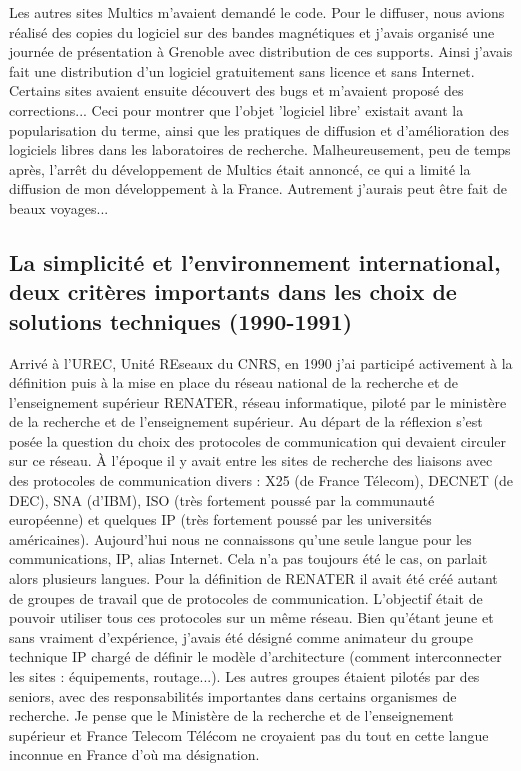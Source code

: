 \documentclass{FramateX}
\begin{document}
\begin{refsection}
Les autres sites Multics m'avaient demandé le code. Pour le diffuser,
nous avions réalisé des copies du logiciel sur des bandes magnétiques
et j'avais organisé une journée de présentation à Grenoble avec
distribution de ces supports. Ainsi j'avais fait une distribution d'un
logiciel gratuitement sans licence et sans Internet. Certains sites
avaient ensuite découvert des bugs et m'avaient proposé des
corrections... Ceci pour montrer que l'objet 'logiciel libre' existait
avant la popularisation du terme, ainsi que les pratiques de diffusion
et d'amélioration des logiciels libres dans les laboratoires de
recherche. Malheureusement, peu de temps après, l'arrêt du
développement de Multics était annoncé, ce qui a limité la diffusion de
mon développement à la France. Autrement j'aurais peut être fait de
beaux voyages...


\subsection*{La simplicité et l'environnement international, deux critères importants
dans les choix de solutions techniques (1990-1991)}

Arrivé à l'UREC, Unité REseaux du CNRS, en 1990 j'ai participé
activement à la définition puis à la mise en place du réseau national
de la recherche et de l'enseignement supérieur RENATER, réseau
informatique, piloté par le ministère de la recherche et de
l'enseignement supérieur. Au départ de la réflexion s'est posée la
question du choix des protocoles de communication qui devaient circuler
sur ce réseau. À l'époque il y avait entre les sites de recherche des
liaisons avec des protocoles de communication divers : X25 (de France
Télecom), DECNET (de DEC), SNA (d'IBM), ISO (très fortement poussé par
la communauté européenne) et quelques IP (très fortement poussé par les
universités américaines). Aujourd'hui nous ne connaissons qu'une seule
langue pour les communications, IP, alias Internet. Cela n'a pas
toujours été le cas, on parlait alors plusieurs langues. Pour la
définition de RENATER il avait été créé autant de groupes de travail
que de protocoles de communication. L'objectif était de pouvoir
utiliser tous ces protocoles sur un même réseau. Bien qu'étant jeune et
sans vraiment d'expérience, j'avais été désigné comme animateur du
groupe technique IP chargé de définir le modèle d'architecture (comment
interconnecter les sites : équipements, routage...). Les autres groupes
étaient pilotés par des seniors, avec des responsabilités importantes
dans certains organismes de recherche. Je pense que le Ministère de la
recherche et de l'enseignement supérieur et France Telecom Télécom ne
croyaient pas du tout en cette langue inconnue en France d'où ma
désignation.


\end{refsection}
\end{document}
